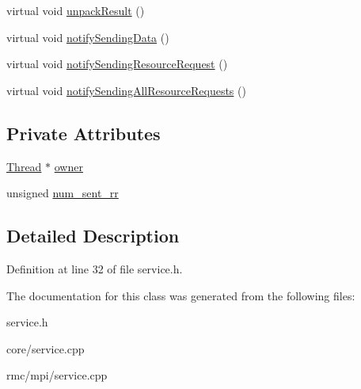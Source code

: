 \begin{CompactItemize}
\item 
\hypertarget{classService_45c06344edbfa482b91f68e2035a6099}{
virtual void \hyperlink{classService_45c06344edbfa482b91f68e2035a6099}{unpack\-Result} ()}
\label{classService_45c06344edbfa482b91f68e2035a6099}

\item 
\hypertarget{classService_81ad4d6ebb50045b8977e2ab74826f30}{
virtual void \hyperlink{classService_81ad4d6ebb50045b8977e2ab74826f30}{notify\-Sending\-Data} ()}
\label{classService_81ad4d6ebb50045b8977e2ab74826f30}

\item 
\hypertarget{classService_94e2012e76aaae3aa8199250f558d503}{
virtual void \hyperlink{classService_94e2012e76aaae3aa8199250f558d503}{notify\-Sending\-Resource\-Request} ()}
\label{classService_94e2012e76aaae3aa8199250f558d503}

\item 
\hypertarget{classService_f94cc8a5c2665d4574041737e61e9ffc}{
virtual void \hyperlink{classService_f94cc8a5c2665d4574041737e61e9ffc}{notify\-Sending\-All\-Resource\-Requests} ()}
\label{classService_f94cc8a5c2665d4574041737e61e9ffc}

\end{CompactItemize}
\subsection*{Private Attributes}
\begin{CompactItemize}
\item 
\hypertarget{classService_8b615c65c876f342fe8209eb7e36d7b2}{
\hyperlink{classThread}{Thread} $\ast$ \hyperlink{classService_8b615c65c876f342fe8209eb7e36d7b2}{owner}}
\label{classService_8b615c65c876f342fe8209eb7e36d7b2}

\item 
\hypertarget{classService_a5b2ad9520bb3710b54348b99acebd58}{
unsigned \hyperlink{classService_a5b2ad9520bb3710b54348b99acebd58}{num\_\-sent\_\-rr}}
\label{classService_a5b2ad9520bb3710b54348b99acebd58}

\end{CompactItemize}


\subsection{Detailed Description}




Definition at line 32 of file service.h.

The documentation for this class was generated from the following files:\begin{CompactItemize}
\item 
service.h\item 
core/service.cpp\item 
rmc/mpi/service.cpp\end{CompactItemize}
